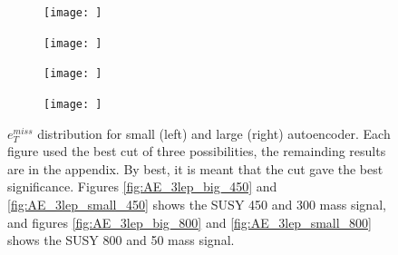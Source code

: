 \begin{figure}[H]
    \centering
    \begin{subfigure}{.45\textwidth}
        \texttt{[image: ]}
        \caption{ }
        \label{fig:AE_3lep_big_450_cut_etmiss}
    \end{subfigure}
    \hfill
    \begin{subfigure}{.45\textwidth}
        \texttt{[image: ]}
        \caption{}
        \label{fig:AE_3lep_small_450_cut_etmiss}
    \end{subfigure}
    \hfill
    \begin{subfigure}{.45\textwidth}
        \texttt{[image: ]}
        \caption{}
        \label{fig:AE_3lep_big_800_cut_etmiss}
    \end{subfigure}
    \hfill   
    \begin{subfigure}{.45\textwidth}
        \texttt{[image: ]}
        \caption{}
        \label{fig:AE_3lep_small_800_cut_etmiss}
    \end{subfigure}
    \hfill      
    \caption[$e_T^{miss}$ best cuts for regular autoencoder]{$e_T^{miss}$ distribution for small (left) and large (right) autoencoder.
    Each figure used the best cut of three possibilities, the remainding results are in the appendix. By best, it is meant that the cut
    gave the best significance. Figures \ref{fig:AE_3lep_big_450} and \ref{fig:AE_3lep_small_450} shows the SUSY 450 and 300 mass signal, 
    and figures \ref{fig:AE_3lep_big_800} and \ref{fig:AE_3lep_small_800} shows the SUSY 800 and 50 mass signal.}
    \label{fig:AE_3lep_recon_err_both_sig_cut_etmiss}
\end{figure}

